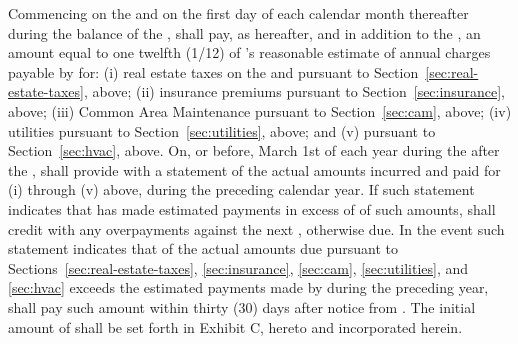 Commencing on the \rentCommencementDate and on the first day of each calendar month thereafter during the balance of the \termOfLease, \lessee shall pay, as \additionalRent hereafter, and in addition to the \baseMonthlyRent, an amount equal to one twelfth (1/12) of \lessor's reasonable estimate of annual charges payable by \lessee for: (i) real estate taxes on the \building and \commonAreas pursuant to Section~\ref{sec:real-estate-taxes}, above; (ii) insurance premiums pursuant to Section~\ref{sec:insurance}, above; (iii) Common Area Maintenance pursuant to Section~\ref{sec:cam}, above; (iv) utilities pursuant to Section~\ref{sec:utilities}, above; and (v) \hvacMaintenance pursuant to Section~\ref{sec:hvac}, above. On, or before, March 1st of each year during the \termOfLease after the \rentCommencementDate, \lessor shall provide \lessee with a statement of the actual amounts incurred and paid for (i) through (v) above, during the preceding calendar year. If such statement indicates that \lessee has made estimated payments in excess of \lesseesPercentage of such amounts, \lessor shall credit \lessee with any overpayments against the next \monthlyRent, otherwise due. In the event such statement indicates that \lesseesPercentage of the actual amounts due pursuant to Sections~\ref{sec:real-estate-taxes}, \ref{sec:insurance}, \ref{sec:cam}, \ref{sec:utilities}, and \ref{sec:hvac} exceeds the estimated payments made by \lessee during the preceding year, \lessee shall pay such amount within thirty (30) days after notice from \lessor. The initial amount of \additionalRent shall be set forth in Exhibit C, hereto and incorporated herein.
